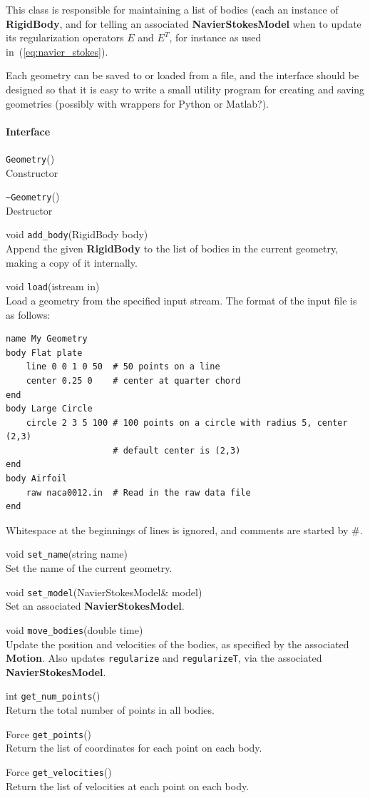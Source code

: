 \documentclass[11pt]{article}
\def\class#1{{\bf #1}} %
\def\fn#1{{\tt #1}} %
\begin{document}
This class is responsible for maintaining a list of bodies (each an instance of \class{RigidBody}, and for telling an associated \class{NavierStokesModel} when to update its regularization operators $E$ and $E^T$, for instance as used in~(\ref{eq:navier_stokes}).

Each geometry can be saved to or loaded from a file, and the interface should be designed so that it is easy to write a small utility program for creating and saving geometries (possibly with wrappers for Python or Matlab?).  

\paragraph{Interface}
\begin{description}
	\item \fn{Geometry}() \\
		Constructor
	\item \fn{\~\null Geometry}() \\
		Destructor
	\item void \fn{add\_body}(RigidBody body) \\
		Append the given \class{RigidBody} to the list of bodies in the current geometry, making a copy of it internally.
	\item void \fn{load}(istream in) \\
		Load a geometry from the specified input stream.  The format of the input file is as follows:
\begin{verbatim}
name My Geometry
body Flat plate
	line 0 0 1 0 50  # 50 points on a line
	center 0.25 0    # center at quarter chord
end
body Large Circle
	circle 2 3 5 100 # 100 points on a circle with radius 5, center (2,3)
					 # default center is (2,3)
end
body Airfoil
	raw naca0012.in  # Read in the raw data file
end
		\end{verbatim}
	 Whitespace at the beginnings of lines is ignored, and comments are started by \#.
	\item void \fn{set\_name}(string name) \\
		Set the name of the current geometry.
	\item void \fn{set\_model}(NavierStokesModel\& model) \\
		Set an associated \class{NavierStokesModel}.
	\item void \fn{move\_bodies}(double time) \\
		Update the position and velocities of the bodies, as specified by the associated \class{Motion}.  Also updates \fn{regularize} and \fn{regularizeT}, via the associated \class{NavierStokesModel}.
	\item int \fn{get\_num\_points}() \\
		Return the total number of points in all bodies.
	\item Force \fn{get\_points}() \\
		Return the list of coordinates for each point on each body.
	\item Force \fn{get\_velocities}() \\
		Return the list of velocities at each point on each body.		
\end{description}
\end{document}
